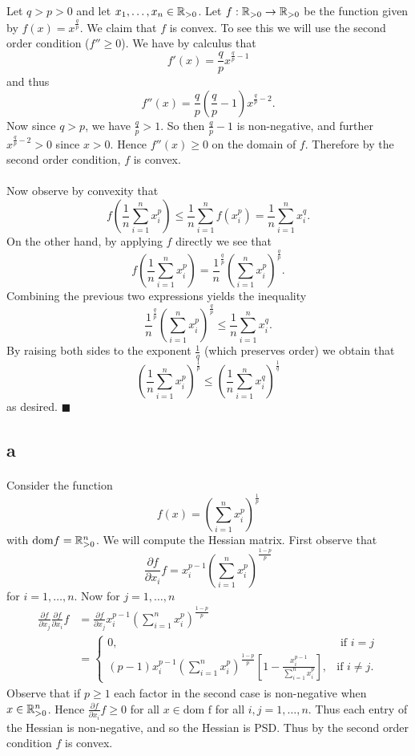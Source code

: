 \documentclass[letterpaper,12pt,oneside,onecolumn]{article}
\begin{document}
\section{}
\paragraph{}
Let $q > p > 0$ and let $x_1, \dots, x_n \in \mathbb{R}_{>0}$. Let $f : \mathbb{R}_{>0} \rightarrow \mathbb{R}_{>0}$ be the function given by $f(x) = x^\frac{q}{p}$. We claim that $f$ is convex. To see this we will use the second order condition ($f'' \geq 0$). We have by calculus that
$$f' (x)= \frac{q}{p} x^{\frac{q}{p}-1}$$
and thus 
$$f''(x) = \frac{q}{p}(\frac{q}{p} -1) x^{\frac{q}{p} - 2}.$$
Now since $q > p$, we have $\frac{q}{p} > 1$. So then $\frac{q}{p} - 1$ is non-negative, and further $x^{\frac{q}{p} - 2} > 0$ since $x >0$. Hence $f''(x) \geq 0$ on the domain of $f$. Therefore by the second order condition, $f$ is convex.
\paragraph{}
Now observe by convexity that
$$f(\frac{1}{n}\sum_{i=1}^n x_i^p) \leq \frac{1}{n} \sum_{i=1}^n f(x_i^p) = \frac{1}{n} \sum_{i=1}^n x_i^q.$$
On the other hand, by applying $f$ directly we see that
$$f(\frac{1}{n}\sum_{i=1}^n x_i^p) = \frac{1}{n}^\frac{q}{p}(\sum_{i=1}^n x_i^p)^\frac{q}{p}.$$
Combining the previous two expressions yields the inequality
$$\frac{1}{n}^\frac{q}{p}(\sum_{i=1}^n x_i^p)^\frac{q}{p} \leq \frac{1}{n} \sum_{i=1}^n x_i^q.$$
By raising both sides to the exponent $\frac{1}{q}$ (which preserves order) we obtain that
$$(\frac{1}{n}\sum_{i=1}^n x_i^p)^\frac{1}{p} \leq (\frac{1}{n} \sum_{i=1}^n x_i^q)^\frac{1}{q}$$
as desired. $\blacksquare$
\subsection{a}
\paragraph{}
Consider the function
$$f(x) = (\sum_{i=1}^n x_i^p)^\frac{1}{p}$$
with $\text{dom} f = \mathbb{R}^n_{>0}$. We will compute the Hessian matrix. First observe that
$$\frac{\partial f}{\partial x_i} f = x_i^{p-1}(\sum_{i=1}^n x_i^p)^\frac{1-p}{p}$$
for $i = 1, \dots, n$. Now for $j = 1, \dots, n$
\begin{align*}
\frac{\partial f}{\partial x_j}\frac{\partial f}{\partial x_i} f &= \frac{\partial f}{\partial x_j}   x_i^{p-1}(\sum_{i=1}^n x_i^p)^\frac{1-p}{p} \\
&= \begin{cases}
0, &\text{ if } i=j \\
(p-1)x_i^{p-1}(\sum_{i=1}^n x_i^p)^\frac{1-p}{p}[1- \frac{x_i^{p-1}}{\sum_{i=1}^n x_i^p}], &\text{if } i \neq j.
\end{cases}
\end{align*}
Observe that if $p \geq 1$ each factor in the second case is non-negative when $x \in \mathbb{R}^n_{>0}$. Hence $\frac{\partial f}{\partial x_i} f  \geq 0$ for all $x \in \text{dom f}$ for all $i,j = 1, \dots, n$. Thus each entry of the Hessian is non-negative, and so the Hessian is PSD. Thus by the second order condition $f$ is convex.
\end{document}
